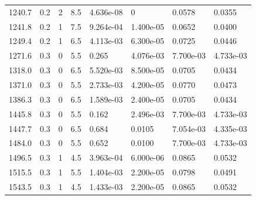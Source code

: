\documentclass[preview]{standalone}
\begin{document}
{{{\begin{tabular}{L{1.2cm}C{1.2cm} C{0.3cm}C{0.5cm} C{1.4cm}C{1.4cm} C{1.4cm}C{1.4cm}}
  1240.7  &   0.2  & 2     & 8.5 &  4.636e-08  & 0  & 0.0578 &  0.0355   \\ 
  1241.8  &   0.2  & 1     & 7.5 &  9.264e-04  & 1.400e-05  & 0.0652 &  0.0400   \\ 
  1249.4  &   0.2  & 1     & 6.5 &  4.113e-03  & 6.300e-05  & 0.0725 &  0.0446   \\ 
  1271.6  &   0.3  & 0     & 5.5 &  0.265  & 4.076e-03  & 7.700e-03 &  4.733e-03   \\ 
  1318.0  &   0.3  & 0     & 6.5 &  5.520e-03  & 8.500e-05  & 0.0705 &  0.0434   \\ 
  1371.0  &   0.3  & 0     & 5.5 &  2.733e-03  & 4.200e-05  & 0.0770 &  0.0473   \\ 
  1386.3  &   0.3  & 0     & 6.5 &  1.589e-03  & 2.400e-05  & 0.0705 &  0.0434   \\ 
  1445.8  &   0.3  & 0     & 5.5 &  0.162  & 2.496e-03  & 7.700e-03 &  4.733e-03   \\ 
  1447.7  &   0.3  & 0     & 6.5 &  0.684  & 0.0105  & 7.054e-03 &  4.335e-03   \\ 
  1484.0  &   0.3  & 0     & 5.5 &  0.652  & 0.0100  & 7.700e-03 &  4.733e-03   \\ 
  1496.5  &   0.3  & 1     & 4.5 &  3.963e-04  & 6.000e-06  & 0.0865 &  0.0532   \\ 
  1515.5  &   0.3  & 1     & 5.5 &  1.404e-03  & 2.200e-05  & 0.0798 &  0.0491   \\ 
  1543.5  &   0.3  & 1     & 4.5 &  1.433e-03  & 2.200e-05  & 0.0865 &  0.0532   \\ 
\hline 
\end{tabular} 

}}}
\end{document}
